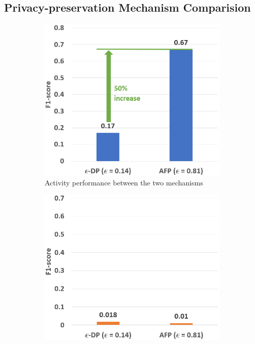 \documentclass{l4proj}
\begin{document}
\begin{appendices}
\subsection{Privacy-preservation Mechanism Comparision}
\begin{figure}[h]
    \centering
    \begin{subfigure}{0.45\textwidth}
    \includegraphics[width=\textwidth]{images/privacy-preservation-difference-comparison-method1-and-method2-activity-f1-scores.png}
    \caption{Activity performance between the two mechanisms}
    \label{fig:privacy-preservation-difference-comparison-method1-and-method2-activity-f1-scores}
    \end{subfigure}
    \qquad
    \begin{subfigure}{0.45\textwidth}
    \includegraphics[width=\textwidth]{images/privacy-preservation-difference-comparison-method1-and-method2-participant-f1-scores.png}

\end{subfigure}
\end{figure}
\end{appendices}
\end{document}
